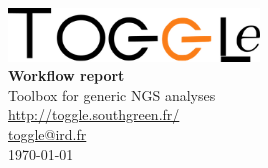 \begin{titlepage}
\vspace*{3cm}
\begin{center}
\includegraphics[width=0.5\textwidth]{../img/toggleLogo2.png}\\[0.9in]
\Huge \textbf {Workflow report}\\[0.7in]
Toolbox for generic NGS analyses\\[0.5in]
	\url{http://toggle.southgreen.fr/}\\
    	\href{mailto:toggle@ird.fr}{toggle@ird.fr}\\
        \vspace{0.7in}
\centering 
\today
\date
\today

\end{center}

\end{titlepage}
